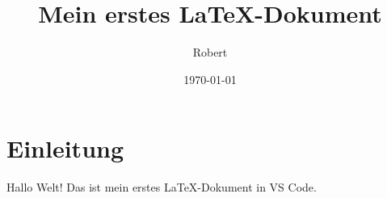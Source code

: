 \documentclass[a4paper,12pt]{article}
\title{Mein erstes LaTeX-Dokument}
\author{Robert}
\date{\today}
\begin{document}
\maketitle

\section{Einleitung}
Hallo Welt! Das ist mein erstes LaTeX-Dokument in VS Code.
\end{document}
